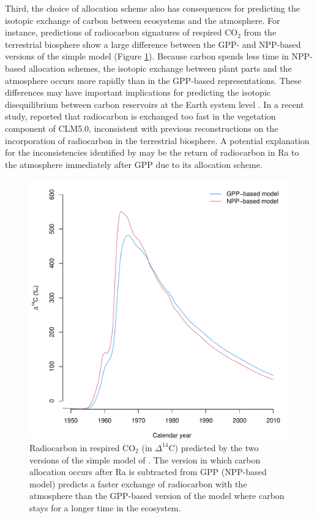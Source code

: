 \documentclass[bg, manuscript]{copernicus}
\begin{document}
Third, the choice of allocation scheme also has consequences for predicting the isotopic exchange of carbon between ecosystems and the atmosphere. For instance, predictions of radiocarbon signatures of respired CO$_2$ from the terrestrial biosphere show a large difference between the GPP- and NPP-based versions of the simple model (Figure \ref{fig:radiocarbon}). Because carbon spends less time in NPP-based allocation schemes, the isotopic exchange between plant parts and the atmosphere occurs more rapidly than in the GPP-based representations.
These differences may have important implications for predicting the isotopic disequilibrium between carbon reservoirs at the Earth system level \citep{Randerson2002, Levin2021, Frischnecht2022}. In a recent study, \citet{Frischnecht2022} reported that radiocarbon is exchanged too fast in the vegetation component of CLM5.0, inconsistent with previous reconstructions on the incorporation of radiocarbon in the terrestrial biosphere. A potential explanation for the inconsistencies identified by \citet{Frischnecht2022} may be the return of radiocarbon in Ra to the atmosphere immediately after GPP due to its allocation scheme. 

\begin{figure}[t]
   \centering
   \includegraphics[scale=0.9]{Fig5_radiocarbon.pdf} %
   \caption{Radiocarbon in respired CO$_2$ (in $\Delta^{14}$C) predicted by the two versions of the simple model of \citet{Emanuel1981}. The version in which carbon allocation occurs after Ra is subtracted from GPP (NPP-based model) predicts a faster exchange of radiocarbon with the atmosphere than the GPP-based version of the model where carbon stays for a longer time in the ecosystem.}
   \label{fig:radiocarbon}
\end{figure}
\end{document}
